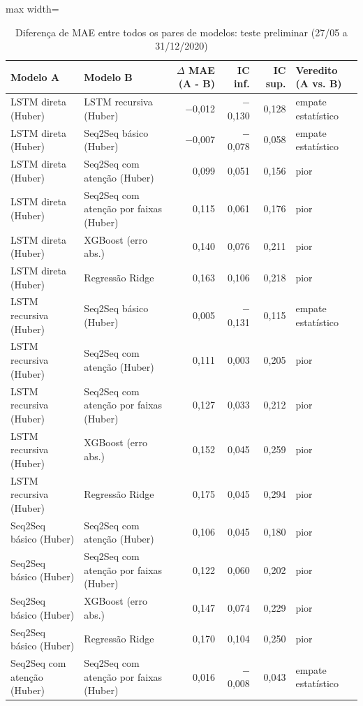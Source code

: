 \begin{table}[!htbp]
    \centering
    \caption{Diferença de MAE entre todos os pares de modelos: teste preliminar (27/05 a 31/12/2020)}
    \label{tab:matriz_teste_historico}
    \small
    \begin{adjustbox}{max width=\textwidth}
    \begin{tabular}{llrrrl}
        \toprule
        Modelo A & Modelo B & $\Delta$ MAE (A - B) & IC inf. & IC sup. & Veredito (A vs. B) \\
        \midrule
        LSTM direta (Huber) & LSTM recursiva (Huber) & $-$0,012 & $-$0,130 & 0,128 & empate estatístico \\
        LSTM direta (Huber) & Seq2Seq básico (Huber) & $-$0,007 & $-$0,078 & 0,058 & empate estatístico \\
        LSTM direta (Huber) & Seq2Seq com atenção (Huber) & 0,099 & 0,051 & 0,156 & pior \\
        LSTM direta (Huber) & Seq2Seq com atenção por faixas (Huber) & 0,115 & 0,061 & 0,176 & pior \\
        LSTM direta (Huber) & XGBoost (erro abs.) & 0,140 & 0,076 & 0,211 & pior \\
        LSTM direta (Huber) & Regressão Ridge & 0,163 & 0,106 & 0,218 & pior \\
        LSTM recursiva (Huber) & Seq2Seq básico (Huber) & 0,005 & $-$0,131 & 0,115 & empate estatístico \\
        LSTM recursiva (Huber) & Seq2Seq com atenção (Huber) & 0,111 & 0,003 & 0,205 & pior \\
        LSTM recursiva (Huber) & Seq2Seq com atenção por faixas (Huber) & 0,127 & 0,033 & 0,212 & pior \\
        LSTM recursiva (Huber) & XGBoost (erro abs.) & 0,152 & 0,045 & 0,259 & pior \\
        LSTM recursiva (Huber) & Regressão Ridge & 0,175 & 0,045 & 0,294 & pior \\
        Seq2Seq básico (Huber) & Seq2Seq com atenção (Huber) & 0,106 & 0,045 & 0,180 & pior \\
        Seq2Seq básico (Huber) & Seq2Seq com atenção por faixas (Huber) & 0,122 & 0,060 & 0,202 & pior \\
        Seq2Seq básico (Huber) & XGBoost (erro abs.) & 0,147 & 0,074 & 0,229 & pior \\
        Seq2Seq básico (Huber) & Regressão Ridge & 0,170 & 0,104 & 0,250 & pior \\
        Seq2Seq com atenção (Huber) & Seq2Seq com atenção por faixas (Huber) & 0,016 & $-$0,008 & 0,043 & empate estatístico \\

\end{tabular}
\end{adjustbox}
\end{table}
